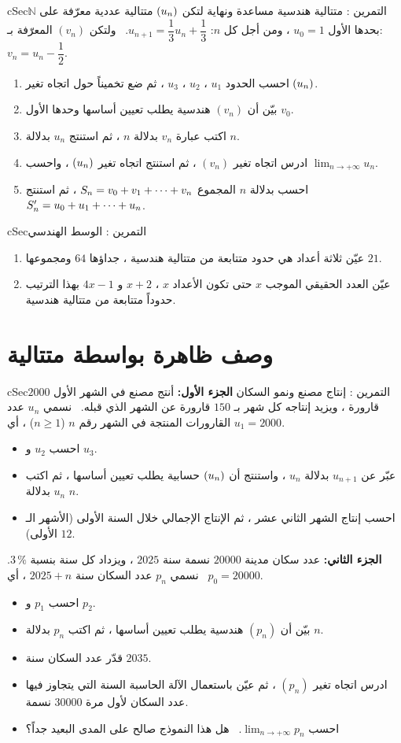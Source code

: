 \documentclass[12pt,a4paper]{article}
\newenvironment{BOX}[2]{\begin{otherlanguage}{english}\begin{arbox}{#1}{#2}}{\end{arbox}\end{otherlanguage}}
\newcounter{exo}
\newenvironment{tamrin}[1]{\stepcounter{exo}\begin{BOX}{cSec}{التمرين \theexo: #1}}{\end{BOX}}
\renewcommand{\cdots}{\mathinner{\cdotp\cdotp\cdotp}}
\newcommand{\N}{\mathbb{N}}
\newcommand{\limn}{\displaystyle\lim_{n\to+\infty}}
\newenvironment{sq}{\begin{itemize}[leftmargin=2.4em,itemsep=3pt]}{\end{itemize}}
\newcommand{\qa}{\item[(أ)]}\newcommand{\qb}{\item[(ب)]}\newcommand{\qc}{\item[(جـ)]}\newcommand{\qd}{\item[(د)]}\newcommand{\qe}{\item[(هـ)]}
\begin{document}
\begin{tamrin}{متتالية هندسية مساعدة ونهاية}
لتكن $(u_n)$ متتالية عددية معرّفة على $\N$ بحدها الأول $u_0=1$ ، ومن أجل كل $n$: $u_{n+1}=\dfrac13u_n+\dfrac13$. \ ولتكن $(v_n)$ المعرّفة بـ: $v_n=u_n-\dfrac12$.
\begin{enumerate}
\item احسب الحدود $u_1$ ، $u_2$ ، $u_3$ ، ثم ضع تخميناً حول اتجاه تغير $(u_n)$.
\item بيّن أن $(v_n)$ هندسية يطلب تعيين أساسها وحدها الأول $v_0$.
\item اكتب عبارة $v_n$ بدلالة $n$ ، ثم استنتج $u_n$ بدلالة $n$.
\item ادرس اتجاه تغير $(v_n)$ ، ثم استنتج اتجاه تغير $(u_n)$ ، واحسب $\limn u_n$.
\item احسب بدلالة $n$ المجموع $S_n=v_0+v_1+\cdots+v_n$ ، ثم استنتج $S'_n=u_0+u_1+\cdots+u_n$.
\end{enumerate}
\end{tamrin}

\begin{tamrin}{الوسط الهندسي}
\begin{enumerate}
\item عيّن ثلاثة أعداد هي حدود متتابعة من متتالية هندسية ، جداؤها $64$ ومجموعها $21$.
\item عيّن العدد الحقيقي الموجب $x$ حتى تكون الأعداد $x$ ، $x+2$ و $4x-1$ بهذا الترتيب حدوداً متتابعة من متتالية هندسية.
\end{enumerate}
\end{tamrin}

\section{وصف ظاهرة بواسطة متتالية}
\begin{tamrin}{إنتاج مصنع ونمو السكان}
\textbf{الجزء الأول:} أنتج مصنع في الشهر الأول $2000$ قارورة ، ويزيد إنتاجه كل شهر بـ $150$ قارورة عن الشهر الذي قبله. \ نسمي $u_n$ عدد القارورات المنتجة في الشهر رقم $n$ ($n\ge1$) ، أي $u_1=2000$.
\begin{sq}
\qa احسب $u_2$ و $u_3$.
\qb عبّر عن $u_{n+1}$ بدلالة $u_n$ ، واستنتج أن $(u_n)$ حسابية يطلب تعيين أساسها ، ثم اكتب $u_n$ بدلالة $n$.
\qc احسب إنتاج الشهر الثاني عشر ، ثم الإنتاج الإجمالي خلال السنة الأولى (الأشهر الـ $12$ الأولى).
\end{sq}
\textbf{الجزء الثاني:} عدد سكان مدينة $20000$ نسمة سنة $2025$ ، ويزداد كل سنة بنسبة $3\,\%$. \ نسمي $p_n$ عدد السكان سنة $2025+n$ ، أي $p_0=20000$.
\begin{sq}
\qa احسب $p_1$ و $p_2$.
\qb بيّن أن $(p_n)$ هندسية يطلب تعيين أساسها ، ثم اكتب $p_n$ بدلالة $n$.
\qc قدّر عدد السكان سنة $2035$.
\qd ادرس اتجاه تغير $(p_n)$ ، ثم عيّن باستعمال الآلة الحاسبة السنة التي يتجاوز فيها عدد السكان لأول مرة $30000$ نسمة.
\qe احسب $\limn p_n$. \ هل هذا النموذج صالح على المدى البعيد جداً؟
\end{sq}
\end{tamrin}
\end{document}
